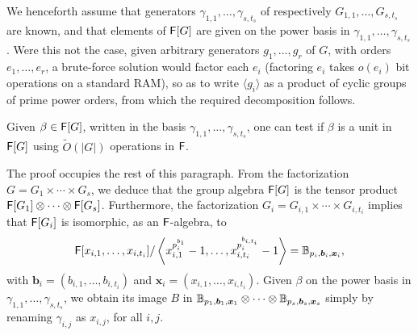 We henceforth assume that generators
$\gamma_{1,1},\dots,\gamma_{s,t_s}$ of respectively
$G_{1,1},\dots,G_{s,t_s}$ are known, and that elements of ${\mathsf{F}}[G]$ are
given on the power basis in $\gamma_{1,1},\dots,\gamma_{s,t_s}$. Were
this not the case, given arbitrary generators $g_1,\dots,g_r$ of $G$, with
orders $e_1,\dots,e_r$, a brute-force solution would factor each $e_i$
(factoring $e_i$ takes $o(e_i)$ bit operations on a standard RAM), so
as to write $\langle g_i \rangle$ as a product of cyclic groups of
prime power orders, from which the required decomposition follows.

\begin{proposition}
  Given $\beta \in {\mathsf{F}}[G]$, written in the basis
  $\gamma_{1,1},\dots,\gamma_{s,t_s}$, one can test if $\beta$ is a
  unit in ${\mathsf{F}}[G]$ using $\tilde{O}(|G|)$ operations in ${\mathsf{F}}$.
\end{proposition}
The proof occupies the rest of this paragraph.
From the factorization $G = G_1 \times \cdots \times G_s$, we deduce
that the group algebra ${\mathsf{F}}[G]$ is the tensor product ${\mathsf{F}}[G_1]
\otimes \cdots \otimes {\mathsf{F}}[G_s]$. Furthermore, the 
factorization $G_i = G_{i,1} \times \cdots \times G_{i,t_i}$
implies that ${\mathsf{F}}[G_i]$ is isomorphic, as an ${\mathsf{F}}$-algebra, to
$${\mathsf{F}}[x_{i,1},\dots,x_{i,t_i}]/\left \langle
x_{i,1}^{p_i^{b_{1}}}-1,\dots,x_{i,t_i}^{p_i^{b_{i,t_i}}}-1\right\rangle
=\mathbb{B}_{p_i,\boldsymbol{b}_i,\boldsymbol{x}_i},$$ with $\boldsymbol{b}_i
= (b_{i,1},\dots,b_{i,t_i})$ and $\boldsymbol{x}_i =
(x_{i,1},\dots,x_{i,t_i})$. Given $\beta$ on the power basis in
$\gamma_{1,1},\dots,\gamma_{s,t_s}$, we obtain its image $B$ in
$\mathbb{B}_{p_1,\boldsymbol{b}_1,\boldsymbol{x}_1} \otimes \cdots \otimes
\mathbb{B}_{p_s,\boldsymbol{b}_s,\boldsymbol{x}_s}$ simply by renaming
$\gamma_{i,j}$ as $x_{i,j}$, for all $i,j$.


